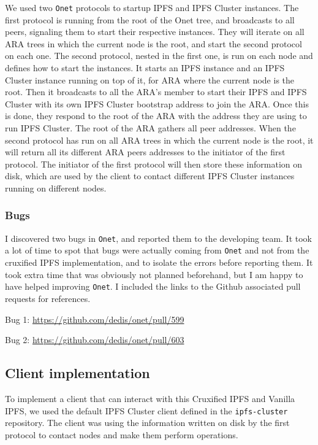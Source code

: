 \documentclass[a4paper,11pt,oneside]{report}
\begin{document}
We used two \texttt{Onet} protocols to startup IPFS and IPFS Cluster instances. The first protocol is running from the root of the Onet tree, and broadcasts to all peers, signaling them to start their respective instances. They will iterate on all ARA trees in which the current node is the root, and start the second protocol on each one. The second protocol, nested in the first one, is run on each node and defines how to start the instances. It starts an IPFS instance and an IPFS Cluster instance running on top of it, for ARA where the current node is the root. Then it broadcasts to all the ARA's member to start their IPFS and IPFS Cluster with its own IPFS Cluster bootstrap address to join the ARA. Once this is done, they respond to the root of the ARA with the address they are using to run IPFS Cluster. The root of the ARA gathers all peer addresses. When the second protocol has run on all ARA trees in which the current node is the root, it will return all its different ARA peers addresses to the initiator of the first protocol. The initiator of the first protocol will then store these information on disk, which are used by the client to contact different IPFS Cluster instances running on different nodes.

\subsubsection{Bugs}

I discovered two bugs in \texttt{Onet}, and reported them to the developing team. It took a lot of time to spot that bugs were actually coming from \texttt{Onet} and not from the cruxified IPFS implementation, and to isolate the errors before reporting them. It took extra time that was obviously not planned beforehand, but I am happy to have helped improving \texttt{Onet}. I included the links to the Github associated pull requests for references.

Bug 1: \url{https://github.com/dedis/onet/pull/599}

Bug 2: \url{https://github.com/dedis/onet/pull/603}

\subsection{Client implementation}

To implement a client that can interact with this Cruxified IPFS and Vanilla IPFS, we used the default IPFS Cluster client defined in the \texttt{ipfs-cluster} \cite{ipfs-cluster-repo} repository. The client was using the information written on disk by the first protocol to contact nodes and make them perform operations.
\end{document}
